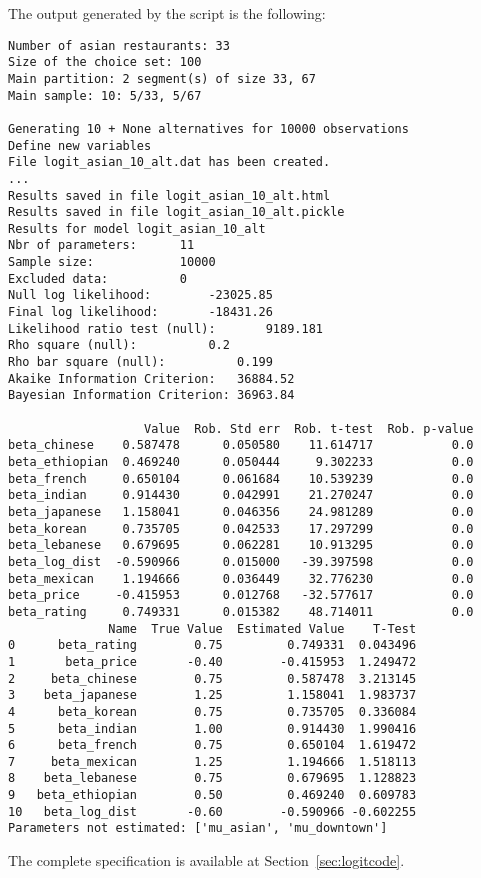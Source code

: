 \documentclass[12pt,a4paper]{article}
\begin{document}
The output generated by the script is the following:
\begin{lstlisting}
Number of asian restaurants: 33
Size of the choice set: 100
Main partition: 2 segment(s) of size 33, 67
Main sample: 10: 5/33, 5/67

Generating 10 + None alternatives for 10000 observations
Define new variables
File logit_asian_10_alt.dat has been created.
...
Results saved in file logit_asian_10_alt.html
Results saved in file logit_asian_10_alt.pickle
Results for model logit_asian_10_alt
Nbr of parameters:		11
Sample size:			10000
Excluded data:			0
Null log likelihood:		-23025.85
Final log likelihood:		-18431.26
Likelihood ratio test (null):		9189.181
Rho square (null):			0.2
Rho bar square (null):			0.199
Akaike Information Criterion:	36884.52
Bayesian Information Criterion:	36963.84

                   Value  Rob. Std err  Rob. t-test  Rob. p-value
beta_chinese    0.587478      0.050580    11.614717           0.0
beta_ethiopian  0.469240      0.050444     9.302233           0.0
beta_french     0.650104      0.061684    10.539239           0.0
beta_indian     0.914430      0.042991    21.270247           0.0
beta_japanese   1.158041      0.046356    24.981289           0.0
beta_korean     0.735705      0.042533    17.297299           0.0
beta_lebanese   0.679695      0.062281    10.913295           0.0
beta_log_dist  -0.590966      0.015000   -39.397598           0.0
beta_mexican    1.194666      0.036449    32.776230           0.0
beta_price     -0.415953      0.012768   -32.577617           0.0
beta_rating     0.749331      0.015382    48.714011           0.0
              Name  True Value  Estimated Value    T-Test
0      beta_rating        0.75         0.749331  0.043496
1       beta_price       -0.40        -0.415953  1.249472
2     beta_chinese        0.75         0.587478  3.213145
3    beta_japanese        1.25         1.158041  1.983737
4      beta_korean        0.75         0.735705  0.336084
5      beta_indian        1.00         0.914430  1.990416
6      beta_french        0.75         0.650104  1.619472
7     beta_mexican        1.25         1.194666  1.518113
8    beta_lebanese        0.75         0.679695  1.128823
9   beta_ethiopian        0.50         0.469240  0.609783
10   beta_log_dist       -0.60        -0.590966 -0.602255
Parameters not estimated: ['mu_asian', 'mu_downtown']
\end{lstlisting}

The complete specification is available at Section~\ref{sec:logitcode}.
\end{document}
